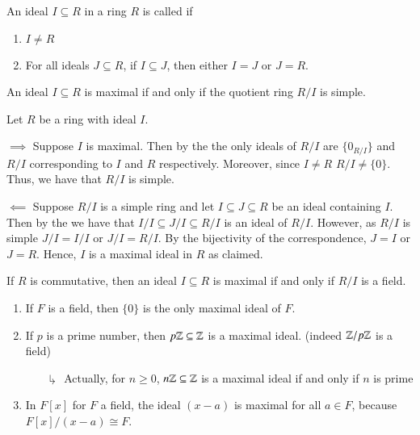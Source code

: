 \documentclass[12pt, a4paper, twoside, openright, titlepage]{book}
\begin{document}
\begin{defn}{}{}
    An ideal $I \subseteq R$ in a ring $R$ is called  if \begin{enumerate}
        \item $I \neq R$
        \item For all ideals $J \subseteq R$, if $I \subseteq J$, then either $I = J$ or $J = R$.
    \end{enumerate}
\end{defn}

\begin{prop}{}{}
    An ideal $I \subseteq R$ is maximal if and only if the quotient ring $R/I$ is simple.
    \begin{proof*}{}{}
        Let $R$ be a ring with ideal $I$. 
        
        $\implies$ Suppose $I$ is maximal. Then by the  the only ideals of $R/I$ are $\{0_{R/I}\}$ and $R/I$ corresponding to $I$ and $R$ respectively. Moreover, since $I \neq R$ $R/I \neq \{0\}$. Thus, we have that $R/I$ is simple.
        
        $\impliedby$ Suppose $R/I$ is a simple ring and let $I \subseteq J \subseteq R$ be an ideal containing $I$. Then by the  we have that $I/I \subseteq J/I \subseteq R/I$ is an ideal of $R/I$. However, as $R/I$ is simple $J/I = I/I$ or $J/I = R/I$. By the bijectivity of the correspondence, $J = I$ or $J = R$. Hence, $I$ is a maximal ideal in $R$ as claimed.
    \end{proof*}
\end{prop}

\begin{cor}{}{}
    If $R$ is commutative, then an ideal $I \subseteq R$ is maximal if and only if $R/I$ is a field.
\end{cor}

\begin{eg}{}{}
    \leavevmode
    \begin{enumerate}
        \item If $F$ is a field, then $\{0\}$ is the only maximal ideal of $F$.
        \item If $p$ is a prime number, then $p\mathbb Z \subseteq \mathbb Z$ is a maximal ideal. (indeed $\mathbb Z/p\mathbb Z$ is a field)
        \begin{enumerate}
            \item[$\drsh$] Actually, for $n \geq 0$, $n\mathbb Z \subseteq \mathbb Z$ is a maximal ideal if and only if $n$ is prime
        \end{enumerate}
        \item In $F[x]$ for $F$ a field, the ideal $(x-a)$ is maximal for all $a \in F$, because $F[x]/(x-a) \cong F$.
    \end{enumerate}
\end{eg}
\end{document}

